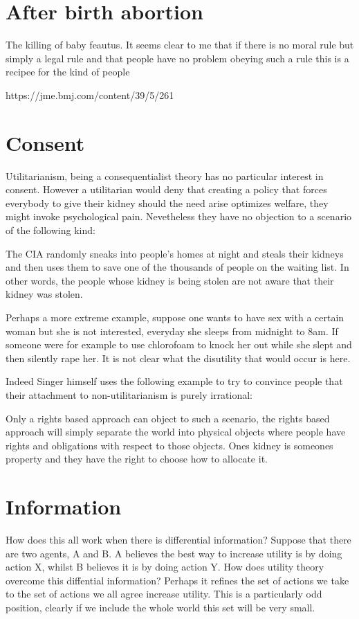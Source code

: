 \section{After birth abortion}

The killing of baby feautus. It seems clear to me that if there is no moral rule but simply a legal rule and that people have no problem obeying such a rule this is a recipee for the kind of people 

https://jme.bmj.com/content/39/5/261

\section{Consent}

Utilitarianism, being a consequentialist theory has no particular interest in consent. However a utilitarian would deny that creating a policy that forces everybody to give their kidney should the need arise optimizes welfare, they might invoke psychological pain. Nevetheless they have no objection to a scenario of the following kind:

The CIA randomly sneaks into people's homes at night and steals their kidneys and then uses them to save one of the thousands of people on the waiting list. In other words, the people whose kidney is being stolen are not aware that their kidney was stolen. 

Perhaps a more extreme example, suppose one wants to have sex with a certain woman but she is not interested, everyday she sleeps from midnight to 8am. If someone were for example to use chlorofoam to knock her out while she slept and then silently rape her. It is not clear what the disutility that would occur is here. 

Indeed Singer himself uses the following example to try to convince people that their attachment to non-utilitarianism is purely irrational: 

Only a rights based approach can object to such a scenario, the rights based approach will simply separate the world into physical objects where people have rights and obligations with respect to those objects. Ones kidney is someones property and they have the right to choose how to allocate it. 


\section{Information}

How does this all work when there is differential information? Suppose that there are two agents, A and B. A believes the best way to increase utility is by doing action X, whilst B believes it is by doing action Y. How does utility theory overcome this diffential information? Perhaps it refines the set of actions we take to the set of actions we all agree increase utility. This is a particularly odd position, clearly if we include the whole world this set will be very small. 


